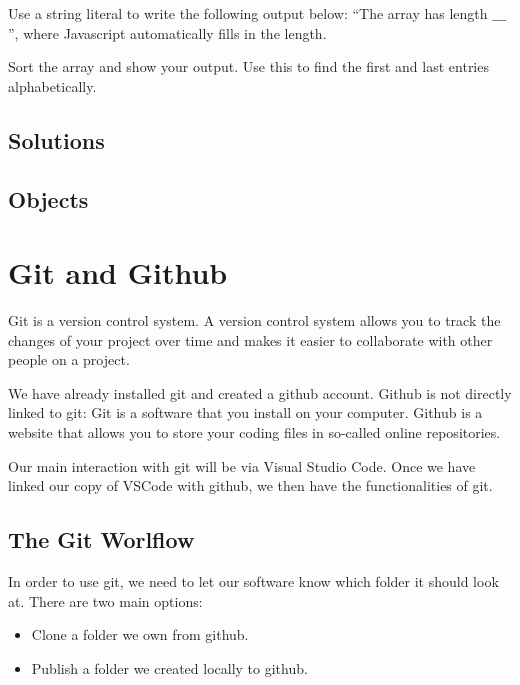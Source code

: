 \documentclass[11pt,a4paper]{report}
\begin{document}
\begin{ex}
Use a string literal to write the following output below: ``The array has length $\_\_\_$'', where Javascript automatically fills in the length.
\end{ex}

\begin{ex}
Sort the array and show your output. Use this to find the first and last entries alphabetically.
\end{ex}


\subsection{Solutions}

\printcursols


\newpage


\subsection{Objects}



\newpage

\section{Git and Github}

Git is a version control system.  A version control system allows you to track the changes of your project over time and makes it easier to collaborate with other people on a project.

We have already installed git and created a github account. Github is not directly linked to git: Git is a software that you install on your computer. Github is a website that allows you to store your coding files in so-called online repositories.

Our main interaction with git will be via Visual Studio Code. Once we have linked our copy of VSCode with github, we then have the functionalities of git.

\subsection{The Git Worlflow}
In order to use git, we need to let our software know which folder it should look at. There are two main options:
\begin{itemize}
\item Clone a folder we own from github.
\item Publish a folder we created locally to github.
\end{itemize}
\end{document}
